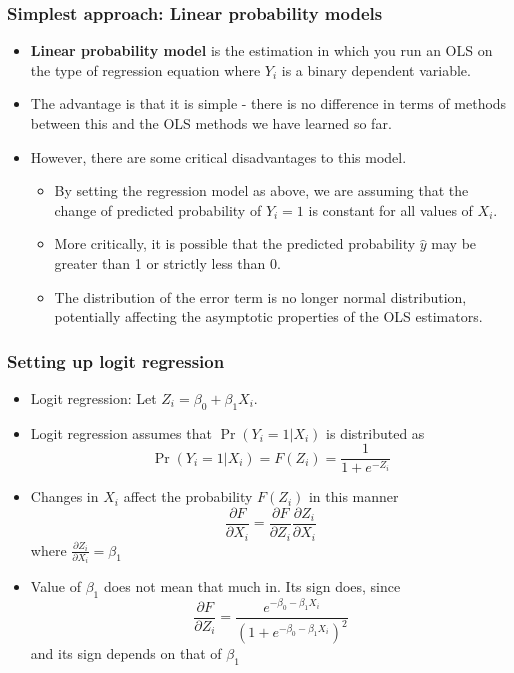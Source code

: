 \documentclass[aspectratio=169]{beamer}
\begin{document}
\begin{frame}
\frametitle{Simplest approach: Linear probability models}
\begin{itemize}
\item \textbf{Linear probability model} is the estimation in which you run an OLS on the type of regression equation where $Y_i$ is a binary dependent variable.
\item The advantage is that it is simple - there is no difference in terms of methods between this and the OLS methods we have learned so far. 
\item However, there are some critical disadvantages to this model. 
\begin{itemize}
\item By setting the regression model as above, we are assuming that the change of predicted probability of $Y_i=1$ is constant for all values of $X_i$. 
\item More critically, it is possible that the predicted probability $\hat{y}$ may be greater than 1 or strictly less than 0.
\item The distribution of the error term is no longer normal distribution, potentially affecting the asymptotic properties of the OLS estimators.
\end{itemize}
\end{itemize}
\end{frame}

\begin{frame}
\frametitle{Setting up logit regression}
\begin{itemize}
\item Logit regression: Let $Z_i=\beta_0+\beta_1X_i$. 
\item Logit regression assumes that  $\Pr(Y_i=1|X_i)$  is distributed as
\[
\Pr(Y_i=1|X_i)=F(Z_i)=\frac{1}{1+e^{-Z_i}}
\]
\item Changes in $X_i$ affect the probability $F(Z_i)$ in this manner
\[
\frac{\partial F}{\partial X_i} = \frac{\partial F}{\partial Z_i}\frac{\partial Z_i}{\partial X_i}  
\]
where $\frac{\partial Z_i}{\partial X_i}  =\beta_1$
\item  Value of $\beta_1$ does not mean that much in. Its sign does, since
\[
 \frac{\partial F}{\partial Z_i}=\frac{e^{-\beta_0 -\beta_1X_i}}{(1+e^{-\beta_0 -\beta_1X_i})^2}
\]
and its sign depends on that of $\beta_1$
\end{itemize}
\end{frame}
\end{document}
